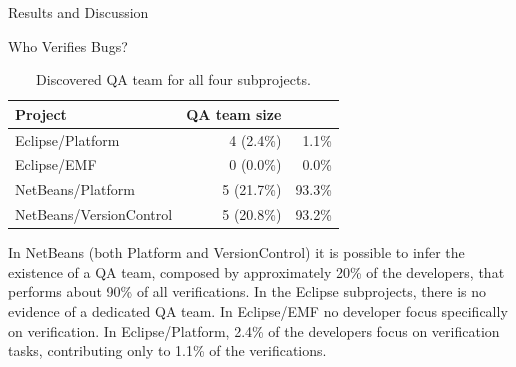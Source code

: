 \begin{section}{Results and Discussion}
\begin{subsection}{Who Verifies Bugs?}
	\begin{table}
		\begin{center}
		
		\caption{Discovered QA team for all four subprojects.}
		\begin{tabular}{l|r|r}
			\textbf{\centering Project} & 
			\textbf{\centering QA team size} & 
			\MyHead{2.5cm}{\textbf{\% of verifications by QA team}} \\
			\hline
			Eclipse/Platform        & 4 (2.4\%)  &  1.1\% \\
			Eclipse/EMF             & 0 (0.0\%)  &  0.0\% \\
			NetBeans/Platform       & 5 (21.7\%) & 93.3\% \\
			NetBeans/VersionControl & 5 (20.8\%) & 93.2\% \\
		\end{tabular}
		\end{center}

		\label{tab:qa}
	\end{table}
	
	
% 
% 
% 
	
	In NetBeans (both Platform and VersionControl) it is possible to infer the existence of a QA team, composed by approximately 20\% of the developers, that performs about 90\% of all verifications. In the Eclipse subprojects, there is no evidence of a dedicated QA team. In Eclipse/EMF no developer focus specifically on verification. In Eclipse/Platform, 2.4\% of the developers focus on verification tasks, contributing only to 1.1\% of the verifications.
	
	
\end{subsection}

\end{section}

